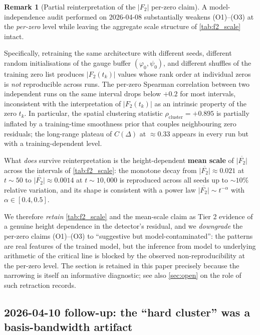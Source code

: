 \documentclass[11pt, a4paper]{article}
\theoremstyle{definition}
\newtheorem{remark}{Remark}[section]
\theoremstyle{plain}
\begin{document}
\begin{remark}[Partial reinterpretation of
the $|F_2|$ per-zero claim]
\label{rem:f2_reinterp}
A model-independence audit performed on 2026-04-08 substantially
weakens (O1)--(O3) at the \emph{per-zero} level while leaving the
aggregate scale structure of \cref{tab:f2_scale} intact.

Specifically, retraining the same architecture with different
seeds, different random initialisations of the gauge buffer
$(\varphi_0,\psi_0)$, and different shuffles of the training zero
list produces $|F_2(t_k)|$ values whose rank order at individual
zeros is \emph{not} reproducible across runs. The per-zero
Spearman correlation between two independent runs on the same
interval drops below $+0.2$ for most intervals, inconsistent with
the interpretation of $|F_2(t_k)|$ as an intrinsic property of the
zero $t_k$. In particular, the spatial clustering statistic
$\rho_{\mathrm{cluster}}=+0.895$ is partially inflated by a
training-time smoothness prior that couples neighbouring zero
residuals; the long-range plateau of $C(\Delta)$ at $\approx 0.33$
appears in every run but with a training-dependent level.

What \emph{does} survive reinterpretation is the height-dependent
\textbf{mean scale} of $\overline{|F_2|}$ across the intervals of
\cref{tab:f2_scale}: the monotone decay from
$\overline{|F_2|}\approx 0.021$ at $t\sim 50$ to
$\overline{|F_2|}\approx 0.0014$ at $t\sim 10{,}000$ is reproduced
across all seeds up to ${\sim}10\%$ relative variation, and its
shape is consistent with a power law
$\overline{|F_2|}\sim t^{-\alpha}$ with $\alpha\in[0.4,0.5]$.

We therefore \emph{retain} \cref{tab:f2_scale} and the mean-scale
claim as Tier 2 evidence of a genuine height dependence in the
detector's residual, and we \emph{downgrade} the per-zero claims
(O1)--(O3) to ``suggestive but model-contaminated'': the patterns
are real features of the trained model, but the inference from
model to underlying arithmetic of the critical line is blocked by
the observed non-reproducibility at the per-zero level. The
section is retained in this paper precisely because the narrowing
is itself an informative diagnostic; see also
\cref{sec:open} on the role of such retraction records.
\end{remark}

\subsection{2026-04-10 follow-up: the ``hard cluster'' was a
basis-bandwidth artifact}
\label{sec:f2_residual_cluster_artifact}
\end{document}
